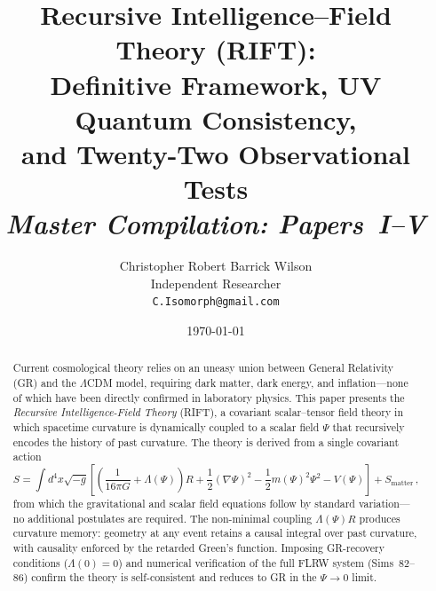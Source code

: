 \documentclass[12pt,a4paper]{article}
\begin{document}
\title{Recursive Intelligence--Field Theory (RIFT):\\
Definitive Framework, UV Quantum Consistency,\\
and Twenty-Two Observational Tests\\[4pt]
\large\textit{Master Compilation: Papers~I--V}}

\author{Christopher Robert Barrick Wilson\\
\small Independent Researcher\\
\small \texttt{C.Isomorph@gmail.com}}

\date{\today}

\maketitle

\begin{abstract}
Current cosmological theory relies on an uneasy union between General
Relativity (GR) and the $\Lambda$CDM model, requiring dark matter, dark
energy, and inflation---none of which have been directly confirmed in
laboratory physics. This paper presents the \emph{Recursive
Intelligence-Field Theory} (RIFT), a covariant scalar--tensor field
theory in which spacetime curvature is dynamically coupled to a scalar
field $\Psi$ that recursively encodes the history of past curvature.
The theory is derived from a single covariant action
\begin{equation*}
S = \int d^4x\sqrt{-g}
\left[\left(\frac{1}{16\pi G}+\Lambda(\Psi)\right)R
+ \frac{1}{2}(\nabla\Psi)^2
- \frac{1}{2}m(\Psi)^2\Psi^2 - V(\Psi)\right] + S_{\mathrm{matter}}\,,
\end{equation*}
from which the gravitational and scalar field equations follow by
standard variation---no additional postulates are required. The
non-minimal coupling $\Lambda(\Psi)R$ produces curvature memory: geometry
at any event retains a causal integral over past curvature, with
causality enforced by the retarded Green's function. Imposing GR-recovery
conditions ($\Lambda(0)=0$) and numerical verification of the full FLRW
system (Sims~82--86) confirm the theory is self-consistent and reduces to
GR in the $\Psi\to 0$ limit.


\end{abstract}
\end{document}
